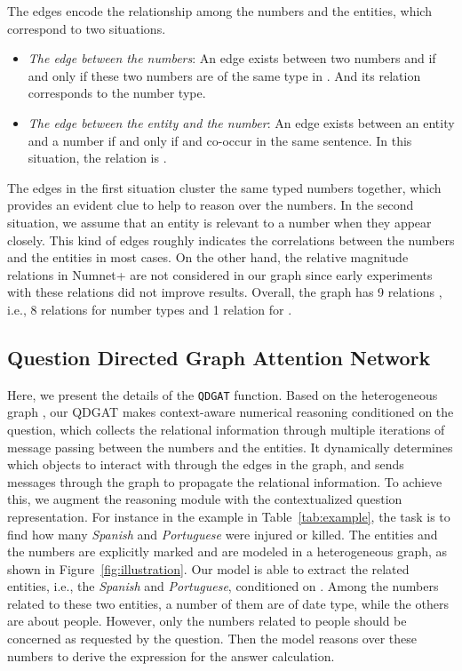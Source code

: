 \documentclass{article}
\begin{document}
The edges  encode the relationship among the numbers and the entities, which correspond to two situations.
\begin{itemize}[leftmargin=*,nolistsep,nosep]
\setlength\itemsep{0.5em}
\item \textit{The edge between the numbers}: An edge  exists between two numbers  and  if and only if these two numbers are of the same type in . And its relation  corresponds to the number type.
\item \textit{The edge between the entity and the number}: An edge  exists between an entity  and a number  if and only if  and  co-occur in the same sentence. In this situation, the relation  is .
\end{itemize}
The edges in the first situation cluster the same typed numbers together, which provides an evident clue to help to reason over the numbers.
In the second situation, we assume that an entity is relevant to a number when they appear closely.
This kind of edges roughly indicates the correlations between the numbers and the entities in most cases. On the other hand, the relative magnitude relations in Numnet+ are not considered in our graph since early experiments with these relations did not improve results.
Overall, the graph has 9 relations , i.e., 8 relations for number types and 1 relation for . 

\subsection{Question Directed Graph Attention Network}
Here, we present the details of the \texttt{QDGAT} function.
Based on the heterogeneous graph , our QDGAT makes context-aware numerical reasoning conditioned on the question, which collects the relational information through multiple iterations of message passing between the numbers and the entities.
It dynamically determines which objects to interact with through the edges in the graph, and sends messages through the graph to propagate the relational information.
To achieve this, we augment the reasoning module with the contextualized question representation.
For instance in the example in Table~\ref{tab:example}, the task is to find how many \emph{Spanish} and \emph{Portuguese} were injured or killed.
The entities and the numbers are explicitly marked and are modeled in a heterogeneous graph, as shown in Figure~\ref{fig:illustration}. 
Our model is able to extract the related entities, i.e., the \emph{Spanish} and \emph{Portuguese}, conditioned on .
Among the numbers related to these two entities, a number of them are of date type, while the others are about people.
However, only the numbers related to people should be concerned as requested by the question. 
Then the model reasons over these numbers to derive the expression for the answer calculation.
\end{document}

